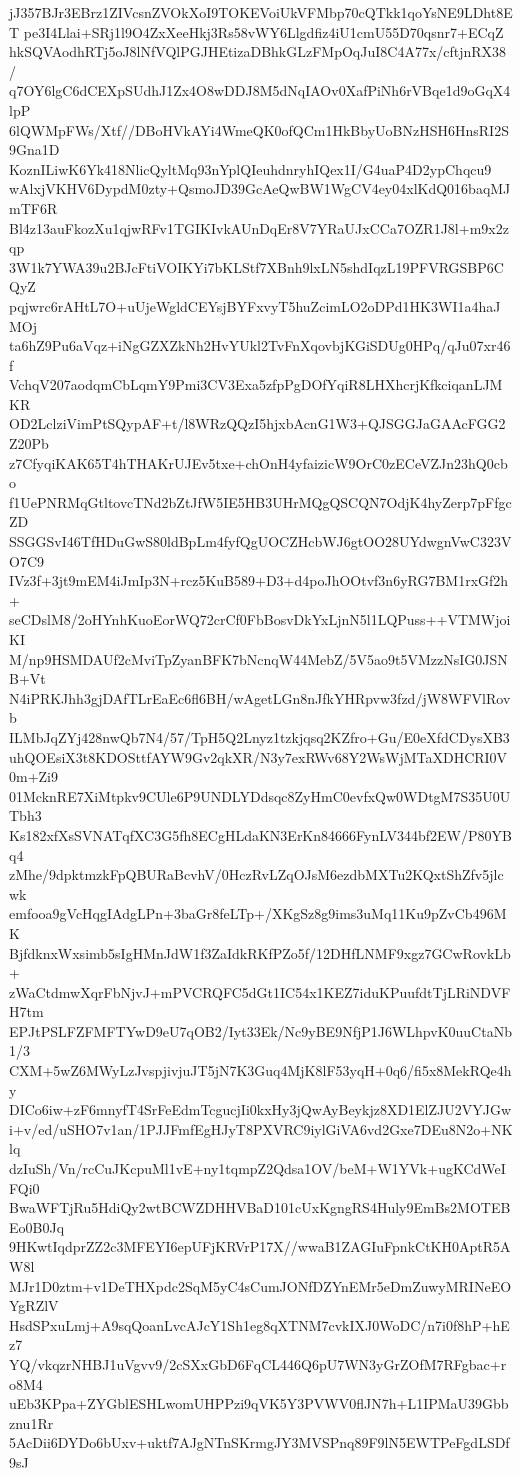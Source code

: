 jJ357BJr3EBrz1ZIVcsnZVOkXoI9TOKEVoiUkVFMbp70cQTkk1qoYsNE9LDht8ET
pe3I4Llai+SRj1l9O4ZxXeeHkj3Rs58vWY6Llgdfiz4iU1cmU55D70qsnr7+ECqZ
hkSQVAodhRTj5oJ8lNfVQlPGJHEtizaDBhkGLzFMpOqJuI8C4A77x/cftjnRX38/
q7OY6lgC6dCEXpSUdhJ1Zx4O8wDDJ8M5dNqIAOv0XafPiNh6rVBqe1d9oGqX4lpP
6lQWMpFWs/Xtf//DBoHVkAYi4WmeQK0ofQCm1HkBbyUoBNzHSH6HnsRI2S9Gna1D
KoznILiwK6Yk418NlicQyltMq93nYplQIeuhdnryhIQex1I/G4uaP4D2ypChqcu9
wAlxjVKHV6DypdM0zty+QsmoJD39GcAeQwBW1WgCV4ey04xlKdQ016baqMJmTF6R
Bl4z13auFkozXu1qjwRFv1TGIKIvkAUnDqEr8V7YRaUJxCCa7OZR1J8l+m9x2zqp
3W1k7YWA39u2BJcFtiVOIKYi7bKLStf7XBnh9lxLN5shdIqzL19PFVRGSBP6CQyZ
pqjwrc6rAHtL7O+uUjeWgldCEYsjBYFxvyT5huZcimLO2oDPd1HK3WI1a4haJMOj
ta6hZ9Pu6aVqz+iNgGZXZkNh2HvYUkl2TvFnXqovbjKGiSDUg0HPq/qJu07xr46f
VchqV207aodqmCbLqmY9Pmi3CV3Exa5zfpPgDOfYqiR8LHXhcrjKfkciqanLJMKR
OD2LclziVimPtSQypAF+t/l8WRzQQzI5hjxbAcnG1W3+QJSGGJaGAAcFGG2Z20Pb
z7CfyqiKAK65T4hTHAKrUJEv5txe+chOnH4yfaizicW9OrC0zECeVZJn23hQ0cbo
f1UePNRMqGtltovcTNd2bZtJfW5IE5HB3UHrMQgQSCQN7OdjK4hyZerp7pFfgcZD
SSGGSvI46TfHDuGwS80ldBpLm4fyfQgUOCZHcbWJ6gtOO28UYdwgnVwC323VO7C9
IVz3f+3jt9mEM4iJmIp3N+rcz5KuB589+D3+d4poJhOOtvf3n6yRG7BM1rxGf2h+
seCDslM8/2oHYnhKuoEorWQ72crCf0FbBosvDkYxLjnN5l1LQPuss++VTMWjoiKI
M/np9HSMDAUf2cMviTpZyanBFK7bNcnqW44MebZ/5V5ao9t5VMzzNsIG0JSNB+Vt
N4iPRKJhh3gjDAfTLrEaEc6fl6BH/wAgetLGn8nJfkYHRpvw3fzd/jW8WFVlRovb
ILMbJqZYj428nwQb7N4/57/TpH5Q2Lnyz1tzkjqsq2KZfro+Gu/E0eXfdCDysXB3
uhQOEsiX3t8KDOSttfAYW9Gv2qkXR/N3y7exRWv68Y2WsWjMTaXDHCRI0V0m+Zi9
01McknRE7XiMtpkv9CUle6P9UNDLYDdsqc8ZyHmC0evfxQw0WDtgM7S35U0UTbh3
Ks182xfXsSVNATqfXC3G5fh8ECgHLdaKN3ErKn84666FynLV344bf2EW/P80YBq4
zMhe/9dpktmzkFpQBURaBcvhV/0HczRvLZqOJsM6ezdbMXTu2KQxtShZfv5jlcwk
emfooa9gVcHqgIAdgLPn+3baGr8feLTp+/XKgSz8g9ims3uMq11Ku9pZvCb496MK
BjfdknxWxsimb5sIgHMnJdW1f3ZaIdkRKfPZo5f/12DHfLNMF9xgz7GCwRovkLb+
zWaCtdmwXqrFbNjvJ+mPVCRQFC5dGt1IC54x1KEZ7iduKPuufdtTjLRiNDVFH7tm
EPJtPSLFZFMFTYwD9eU7qOB2/Iyt33Ek/Nc9yBE9NfjP1J6WLhpvK0uuCtaNb1/3
CXM+5wZ6MWyLzJvspjivjuJT5jN7K3Guq4MjK8lF53yqH+0q6/fi5x8MekRQe4hy
DICo6iw+zF6mnyfT4SrFeEdmTcgucjIi0kxHy3jQwAyBeykjz8XD1ElZJU2VYJGw
i+v/ed/uSHO7v1an/1PJJFmfEgHJyT8PXVRC9iylGiVA6vd2Gxe7DEu8N2o+NKlq
dzIuSh/Vn/rcCuJKcpuMl1vE+ny1tqmpZ2Qdsa1OV/beM+W1YVk+ugKCdWeIFQi0
BwaWFTjRu5HdiQy2wtBCWZDHHVBaD101cUxKgngRS4Huly9EmBs2MOTEBEo0B0Jq
9HKwtIqdprZZ2c3MFEYI6epUFjKRVrP17X//wwaB1ZAGIuFpnkCtKH0AptR5AW8l
MJr1D0ztm+v1DeTHXpdc2SqM5yC4sCumJONfDZYnEMr5eDmZuwyMRINeEOYgRZlV
HsdSPxuLmj+A9sqQoanLvcAJcY1Sh1eg8qXTNM7cvkIXJ0WoDC/n7i0f8hP+hEz7
YQ/vkqzrNHBJ1uVgvv9/2cSXxGbD6FqCL446Q6pU7WN3yGrZOfM7RFgbac+ro8M4
uEb3KPpa+ZYGblESHLwomUHPPzi9qVK5Y3PVWV0flJN7h+L1IPMaU39Gbbznu1Rr
5AcDii6DYDo6bUxv+uktf7AJgNTnSKrmgJY3MVSPnq89F9lN5EWTPeFgdLSDf9sJ
